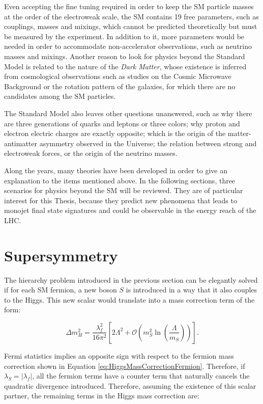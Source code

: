 Even accepting the fine tuning required in order to keep the SM particle masses at the order of the electroweak scale, the SM contains 19 free parameters, such as couplings, masses and mixings, which cannot be predicted theoretically but must be measured by the experiment.
In addition to it, more parameters would be needed in order to accommodate non-accelerator observations, such as neutrino masses and mixings.
Another reason to look for physics beyond the Standard Model is related to the nature of the \emph{Dark Matter}, whose existence is inferred from cosmological observations such as studies on the Cosmic Microwave Background or the rotation pattern of the galaxies, for which there are no candidates among the SM particles.

The Standard Model also leaves other questions unanswered, such as why there are three generations of quarks and leptons or three colors; why proton and electron electric charges are exactly opposite; which is the origin of the matter-antimatter asymmetry observed in the Universe; the relation between strong and electroweak forces, or the origin of the neutrino masses.

Along the years, many theories have been developed in order to give an explanation to the items mentioned above.
In the following sections, three scenarios for physics beyond the SM will be reviewed.
They are of particular interest for this Thesis, because they predict new phenomena that leads to monojet final state signatures and could be observable in the energy reach of the LHC.


\section{Supersymmetry}
\label{sec:SUSY}

The hierarchy problem introduced in the previous section can be elegantly solved if for each SM fermion, a new boson $S$ is introduced in a way that it also couples to the Higgs.
This new scalar would translate into a mass correction term of the form:

\begin{equation}
\Delta m_H^2 = \frac{\lambda_f^2}{16\pi^2}\left[2\Lambda^2 + \mathcal{O}\left(m_S^2\ln{\left(\frac{\Lambda}{m_S}\right)}\right)\right].
\label{eq:HiggsMassCorrectionScalar}
\end{equation}

Fermi statistics implies an opposite sign with respect to the fermion mass correction shown in Equation \ref{eq:HiggsMassCorrectionFermion}.
Therefore, if $\lambda_S = |\lambda_f|$, all the fermion terms have a counter term that naturally cancels the quadratic divergence introduced.
Therefore, assuming the existence of this scalar partner, the remaining terms in the Higgs mass correction are:

